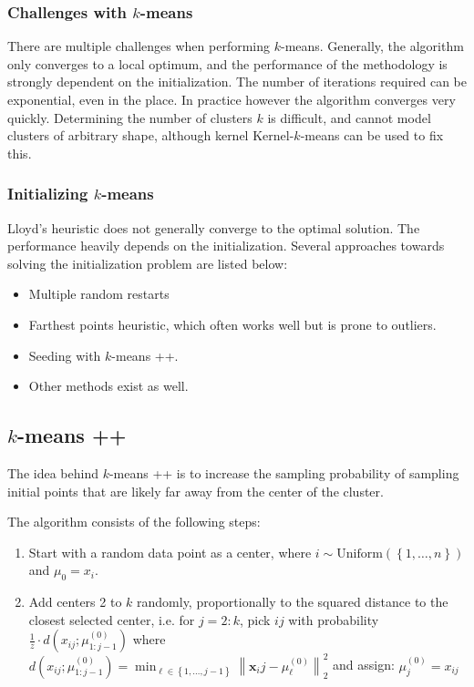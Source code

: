 \documentclass[a4paper,10pt,twoside]{article}
\newcommand\norm[1]{\left\lVert#1\right\rVert}
\begin{document}
\subsubsection{Challenges with $k$-means}

There are multiple challenges when performing $k$-means. Generally, the algorithm only converges to a local optimum, and the performance of the methodology is strongly dependent on the initialization. The number of iterations required can be exponential, even in the place. In practice however the algorithm converges very quickly. Determining the number of clusters $k$ is difficult, and cannot model clusters of arbitrary shape, although kernel Kernel-$k$-means can be used to fix this.

\subsubsection{Initializing $k$-means}
Lloyd's heuristic does not generally converge to the optimal solution. The performance heavily depends on the initialization. Several approaches towards solving the initialization problem are listed below:
\begin{itemize}
    \item Multiple random restarts
    \item Farthest points heuristic, which often works well but is prone to outliers.
    \item Seeding with $k$-means ++.
    \item Other methods exist as well.
\end{itemize}

\subsection{$k$-means ++}
The idea behind $k$-means ++ is to increase the sampling probability of sampling initial points that are likely far away from the center of the cluster.

The algorithm consists of the following steps:
\begin{enumerate}
    \item Start with a random data point as a center, where $i\sim\text{Uniform}(\left\{1,\ldots, n\right\})$ and $\mu_0=x_i$.
    \item Add centers 2 to $k$ randomly, proportionally to the squared distance to the closest selected center, i.e. for $j=2:k$, pick $ij$ with probability $\frac{1}{z}\cdot d(x_{ij};\mu_{1:j-1}^{(0)})$ where $d(x_{ij};\mu_{1:j-1}^{(0)})=\min_{\ell\in\left\{1,\ldots, j-1\right\}}\norm{\mathbf{x}_ij-\mu_{\ell}^{(0)}}_2^2$ and assign: $\mu_j^{(0)}=x_{ij}$
\end{enumerate}
\end{document}

